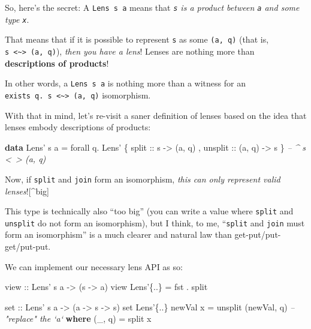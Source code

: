 \documentclass[]{article}
\newenvironment{Shaded}{}{}
\newcommand{\CommentTok}[1]{\textcolor[rgb]{0.38,0.63,0.69}{\textit{#1}}}
\newcommand{\DataTypeTok}[1]{\textcolor[rgb]{0.56,0.13,0.00}{#1}}
\newcommand{\FunctionTok}[1]{\textcolor[rgb]{0.02,0.16,0.49}{#1}}
\newcommand{\KeywordTok}[1]{\textcolor[rgb]{0.00,0.44,0.13}{\textbf{#1}}}
\newcommand{\NormalTok}[1]{#1}
\newcommand{\OtherTok}[1]{\textcolor[rgb]{0.00,0.44,0.13}{#1}}
\begin{document}
So, here's the secret: A \texttt{Lens\textquotesingle{}\ s\ a} means that
\emph{\texttt{s} is a product between \texttt{a} and some type \texttt{x}}.

That means that if it is possible to represent \texttt{s} as some
\texttt{(a,\ q)} (that is,
\texttt{s\ \textless{}\textasciitilde{}\textgreater{}\ (a,\ q)}), \emph{then you
have a lens}! Lenses are nothing more than \textbf{descriptions of products}!

In other words, a \texttt{Lens\textquotesingle{}\ s\ a} is nothing more than a
witness for an
\texttt{exists\ q.\ s\ \textless{}\textasciitilde{}\textgreater{}\ (a,\ q)}
isomorphism.

With that in mind, let's re-visit a saner definition of lenses based on the idea
that lenses embody descriptions of products:

\begin{Shaded}
\begin{Highlighting}[]
\KeywordTok{data} \DataTypeTok{Lens'}\NormalTok{ s a }\FunctionTok{=}\NormalTok{ forall q}\FunctionTok{.}
                 \DataTypeTok{Lens'}\NormalTok{ \{}\OtherTok{ split   ::}\NormalTok{ s }\OtherTok{->}\NormalTok{ (a, q)}
\NormalTok{                       ,}\OtherTok{ unsplit ::}\NormalTok{ (a, q) }\OtherTok{->}\NormalTok{ s}
\NormalTok{                       \}    }\CommentTok{-- ^ s <~> (a, q)}
\end{Highlighting}
\end{Shaded}

Now, if \texttt{split} and \texttt{join} form an isomorphism, \emph{this can
only represent valid lenses}!{[}\^{}big{]}

This type is technically also ``too big'' (you can write a value where
\texttt{split} and \texttt{unsplit} do not form an isomorphism), but I think, to
me, ``\texttt{split} and \texttt{join} must form an isomorphism'' is a much
clearer and natural law than get-put/put-get/put-put.

We can implement our necessary lens API as so:

\begin{Shaded}
\begin{Highlighting}[]
\OtherTok{view ::} \DataTypeTok{Lens'}\NormalTok{ s a }\OtherTok{->}\NormalTok{ (s }\OtherTok{->}\NormalTok{ a)}
\NormalTok{view }\DataTypeTok{Lens'}\NormalTok{\{}\FunctionTok{..}\NormalTok{\} }\FunctionTok{=}\NormalTok{ fst }\FunctionTok{.}\NormalTok{ split}

\OtherTok{set ::} \DataTypeTok{Lens'}\NormalTok{ s a }\OtherTok{->}\NormalTok{ (a }\OtherTok{->}\NormalTok{ s }\OtherTok{->}\NormalTok{ s)}
\NormalTok{set }\DataTypeTok{Lens'}\NormalTok{\{}\FunctionTok{..}\NormalTok{\} newVal x }\FunctionTok{=}\NormalTok{ unsplit (newVal, q)      }\CommentTok{-- "replace" the `a`}
  \KeywordTok{where}
\NormalTok{    (_, q) }\FunctionTok{=}\NormalTok{ split x}
\end{Highlighting}
\end{Shaded}
\end{document}
